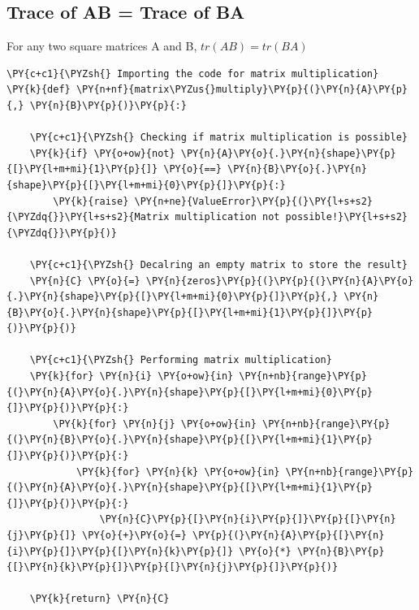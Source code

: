     \hypertarget{trace-of-ab-trace-of-ba}{%
\subsection{Trace of AB = Trace of BA}\label{trace-of-ab-trace-of-ba}}

    For any two square matrices A and B, \(tr(AB) = tr(BA)\)

    \begin{tcolorbox}[breakable, size=fbox, boxrule=1pt, pad at break*=1mm,colback=cellbackground, colframe=cellborder]
\begin{Verbatim}[commandchars=\\\{\}]
\PY{c+c1}{\PYZsh{} Importing the code for matrix multiplication}
\PY{k}{def} \PY{n+nf}{matrix\PYZus{}multiply}\PY{p}{(}\PY{n}{A}\PY{p}{,} \PY{n}{B}\PY{p}{)}\PY{p}{:}

    \PY{c+c1}{\PYZsh{} Checking if matrix multiplication is possible}
    \PY{k}{if} \PY{o+ow}{not} \PY{n}{A}\PY{o}{.}\PY{n}{shape}\PY{p}{[}\PY{l+m+mi}{1}\PY{p}{]} \PY{o}{==} \PY{n}{B}\PY{o}{.}\PY{n}{shape}\PY{p}{[}\PY{l+m+mi}{0}\PY{p}{]}\PY{p}{:}
        \PY{k}{raise} \PY{n+ne}{ValueError}\PY{p}{(}\PY{l+s+s2}{\PYZdq{}}\PY{l+s+s2}{Matrix multiplication not possible!}\PY{l+s+s2}{\PYZdq{}}\PY{p}{)}

    \PY{c+c1}{\PYZsh{} Decalring an empty matrix to store the result}
    \PY{n}{C} \PY{o}{=} \PY{n}{zeros}\PY{p}{(}\PY{p}{(}\PY{n}{A}\PY{o}{.}\PY{n}{shape}\PY{p}{[}\PY{l+m+mi}{0}\PY{p}{]}\PY{p}{,} \PY{n}{B}\PY{o}{.}\PY{n}{shape}\PY{p}{[}\PY{l+m+mi}{1}\PY{p}{]}\PY{p}{)}\PY{p}{)}

    \PY{c+c1}{\PYZsh{} Performing matrix multiplication}
    \PY{k}{for} \PY{n}{i} \PY{o+ow}{in} \PY{n+nb}{range}\PY{p}{(}\PY{n}{A}\PY{o}{.}\PY{n}{shape}\PY{p}{[}\PY{l+m+mi}{0}\PY{p}{]}\PY{p}{)}\PY{p}{:}
        \PY{k}{for} \PY{n}{j} \PY{o+ow}{in} \PY{n+nb}{range}\PY{p}{(}\PY{n}{B}\PY{o}{.}\PY{n}{shape}\PY{p}{[}\PY{l+m+mi}{1}\PY{p}{]}\PY{p}{)}\PY{p}{:}
            \PY{k}{for} \PY{n}{k} \PY{o+ow}{in} \PY{n+nb}{range}\PY{p}{(}\PY{n}{A}\PY{o}{.}\PY{n}{shape}\PY{p}{[}\PY{l+m+mi}{1}\PY{p}{]}\PY{p}{)}\PY{p}{:}
                \PY{n}{C}\PY{p}{[}\PY{n}{i}\PY{p}{]}\PY{p}{[}\PY{n}{j}\PY{p}{]} \PY{o}{+}\PY{o}{=} \PY{p}{(}\PY{n}{A}\PY{p}{[}\PY{n}{i}\PY{p}{]}\PY{p}{[}\PY{n}{k}\PY{p}{]} \PY{o}{*} \PY{n}{B}\PY{p}{[}\PY{n}{k}\PY{p}{]}\PY{p}{[}\PY{n}{j}\PY{p}{]}\PY{p}{)}

    \PY{k}{return} \PY{n}{C}
\end{Verbatim}
\end{tcolorbox}

